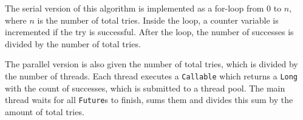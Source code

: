 \documentclass{article}
\begin{document}
  The serial version of this algorithm is implemented as a for-loop from $0$ to $n$, where $n$ is the number of total tries. Inside the loop, a counter variable is incremented if the try is successful. After the loop, the number of successes is divided by the number of total tries.

  The parallel version is also given the number of total tries, which is divided by the number of threads. Each thread executes a \texttt{Callable} which returns a \texttt{Long} with the count of successes, which is submitted to a thread pool. The main thread waits for all \texttt{Future}s to finish, sums them and divides this sum by the amount of total tries.
\end{document}
